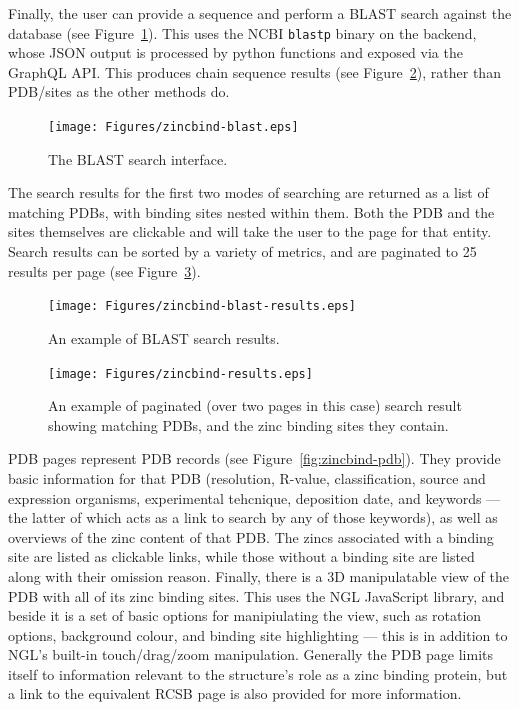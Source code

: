 Finally, the user can provide a sequence and perform a BLAST search against the database (see Figure~\ref{fig:zincbind-blast}). This uses the NCBI \texttt{blastp} binary on the backend, whose JSON output is processed by python functions and exposed via the GraphQL API. This produces chain sequence results (see Figure~\ref{fig:zincbind-blast-results}), rather than PDB/sites as the other methods do.

\begin{figure}
\centering
\texttt{[image: Figures/zincbind-blast.eps]}
\caption{\label{fig:zincbind-blast} The BLAST search interface.}
\end{figure}

The search results for the first two modes of searching are returned as a list of matching PDBs, with binding sites nested within them. Both the PDB and the sites themselves are clickable and will take the user to the page for that entity. Search results can be sorted by a variety of metrics, and are paginated to 25 results per page (see Figure~\ref{fig:zincbind-results}).

\begin{figure}
\centering
\texttt{[image: Figures/zincbind-blast-results.eps]}
\caption{\label{fig:zincbind-blast-results} An example of BLAST search results.}
\end{figure}

\begin{figure}
\centering
\texttt{[image: Figures/zincbind-results.eps]}
\caption[An example of paginated search results.]{\label{fig:zincbind-results} An example of paginated (over two pages
in this case) search result showing matching PDBs, and the zinc binding sites
they contain.}
\end{figure}

PDB pages represent PDB records (see Figure~\ref{fig:zincbind-pdb}). They provide basic information for that PDB (resolution, R-value, classification, source and expression organisms, experimental tehcnique, deposition date, and keywords --- the latter of which acts as a link to search by any of those keywords), as well as overviews of the zinc content of that PDB. The zincs associated with a binding site are listed as clickable links, while those without a binding site are listed along with their omission reason. Finally, there is a 3D manipulatable view of the PDB with all of its zinc binding sites. This uses the NGL JavaScript library, and beside it is a set of basic options for manipiulating the view, such as rotation options, background colour, and binding site highlighting --- this is in addition to NGL's built-in touch/drag/zoom manipulation. Generally the PDB page limits itself to information relevant to the structure's role as a zinc binding protein, but a link to the equivalent RCSB page is also provided for more information.

